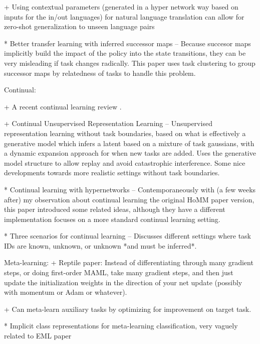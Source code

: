 + Using contextual parameters (generated in a hyper network way based on inputs for the in/out languages) for natural language translation can allow for zero-shot generalization to unseen language pairs \citep{Platanios2017}

* Better transfer learning with inferred successor maps -- Because succesor maps implicitly build the impact of the policy into the state transitions, they can be very misleading if task changes radically. This paper uses task clustering to group successor maps by relatedness of tasks to handle this problem. \citep{Madarasz2019}






Continual:

+ A recent continual learning review \citep{Parisi2019}.

+ Continual Unsupervised Representation Learning -- Unsupervised representation learning without task boundaries, based on what is effectively a generative model which infers a latent based on a mixture of task gaussians, with a dynamic expansion approach for when new tasks are added. Uses the generative model structure to allow replay and avoid catastrophic interference. Some nice developments towards more realistic settings without task boundaries. \citep{Rao2019}

* Continual learning with hypernetworks -- Contemporaneously with (a few weeks after) my observation about continual learning the original HoMM paper version, this paper introduced some related ideas, although they have a different implementation focuses on a more standard continual learning setting. \citep{Oswald2020}

* Three scenarios for continual learning -- Discusses different settings where task IDs are known, unknown, or unknown *and must be inferred*. \citep{Ven2018}



Meta-learning:
+ Reptile paper: Instead of differentiating through many gradient steps, or doing first-order MAML, take many gradient steps, and then just update the initialization weights in the direction of your net update (possibly with momentum or Adam or whatever). \citep{Nichol2018} 

+ Can meta-learn auxiliary tasks by optimizing for improvement on target task. \citep{Liu2019a}

* Implicit class representations for meta-learning classification, very vaguely related to EML paper \citep{Ravichandran2019}


